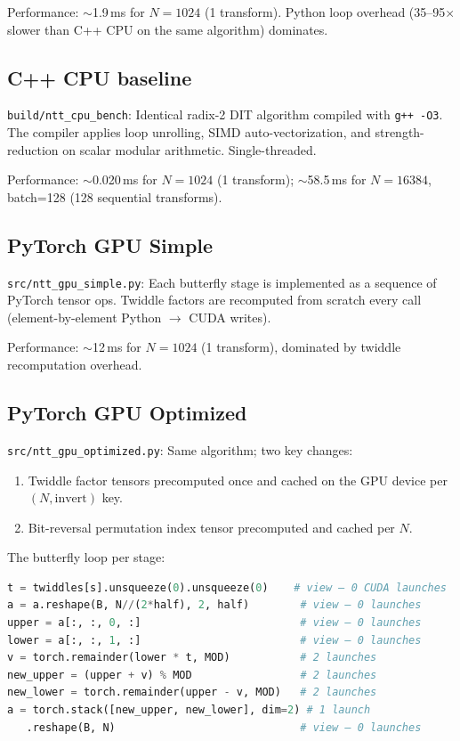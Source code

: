 \documentclass[11pt,a4paper]{article}
\begin{document}
Performance: $\sim$1.9\,ms for $N=1024$ (1 transform). Python loop overhead
(35--95$\times$ slower than C++ CPU on the same algorithm) dominates.

\subsection{C++ CPU baseline}

\texttt{build/ntt\_cpu\_bench}: Identical radix-2 DIT algorithm compiled with
\texttt{g++ -O3}. The compiler applies loop unrolling, SIMD auto-vectorization,
and strength-reduction on scalar modular arithmetic. Single-threaded.

Performance: $\sim$0.020\,ms for $N=1024$ (1 transform); $\sim$58.5\,ms for
$N=16384$, batch=128 (128 sequential transforms).

\subsection{PyTorch GPU Simple}

\texttt{src/ntt\_gpu\_simple.py}: Each butterfly stage is implemented as a sequence
of PyTorch tensor ops. Twiddle factors are recomputed from scratch every call
(element-by-element Python $\to$ CUDA writes).

Performance: $\sim$12\,ms for $N=1024$ (1 transform), dominated by twiddle
recomputation overhead.

\subsection{PyTorch GPU Optimized}

\texttt{src/ntt\_gpu\_optimized.py}: Same algorithm; two key changes:
\begin{enumerate}
  \item Twiddle factor tensors precomputed once and cached on the GPU device
    per $(N, \text{invert})$ key.
  \item Bit-reversal permutation index tensor precomputed and cached per $N$.
\end{enumerate}

The butterfly loop per stage:
\begin{lstlisting}[language=Python]
t = twiddles[s].unsqueeze(0).unsqueeze(0)    # view — 0 CUDA launches
a = a.reshape(B, N//(2*half), 2, half)        # view — 0 launches
upper = a[:, :, 0, :]                         # view — 0 launches
lower = a[:, :, 1, :]                         # view — 0 launches
v = torch.remainder(lower * t, MOD)           # 2 launches
new_upper = (upper + v) % MOD                 # 2 launches
new_lower = torch.remainder(upper - v, MOD)   # 2 launches
a = torch.stack([new_upper, new_lower], dim=2) # 1 launch
   .reshape(B, N)                             # view — 0 launches
\end{lstlisting}
\end{document}
